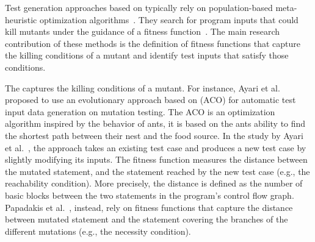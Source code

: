Test generation approaches based on  typically rely on population-based meta-heuristic optimization algorithms~\cite{harman2011strong}. 
They search for program inputs that could kill mutants under the guidance of a fitness function~\cite{harman2011strong}. 
The main research contribution of these methods is the definition of fitness functions that capture the killing conditions of a mutant and identify test inputs that satisfy those conditions.

The  captures the killing conditions of a mutant. For instance, Ayari et al.~\cite{ayari2007automatic} proposed to use an evolutionary approach based on  (ACO) for automatic test input data generation on mutation testing. The ACO is an optimization algorithm inspired by the behavior of ants, it is based on the ants ability to find the shortest path between their nest and the food source. In the study by Ayari et al.~\cite{ayari2007automatic}, the approach takes an existing test case and produces a new test case by slightly modifying its inputs. 
The fitness function measures the distance between the mutated statement, and the statement reached by the new test case (e.g., the reachability condition). More precisely, the distance is defined as the number of basic blocks between the two statements in the program's control flow graph.
Papadakis et al.~\cite{papadakis2011automatically}, instead, rely on fitness functions that capture the distance between mutated statement and the statement covering the branches of the different mutations (e.g., the necessity condition).

